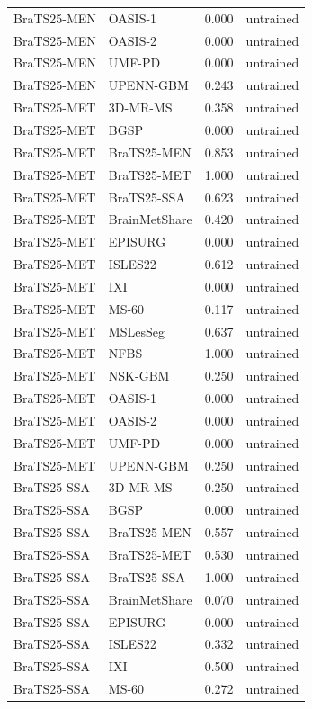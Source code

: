 \begin{tabular}{llrl}
BraTS25-MEN & OASIS-1 & 0.000 & untrained \\
BraTS25-MEN & OASIS-2 & 0.000 & untrained \\
BraTS25-MEN & UMF-PD & 0.000 & untrained \\
BraTS25-MEN & UPENN-GBM & 0.243 & untrained \\
BraTS25-MET & 3D-MR-MS & 0.358 & untrained \\
BraTS25-MET & BGSP & 0.000 & untrained \\
BraTS25-MET & BraTS25-MEN & 0.853 & untrained \\
BraTS25-MET & BraTS25-MET & 1.000 & untrained \\
BraTS25-MET & BraTS25-SSA & 0.623 & untrained \\
BraTS25-MET & BrainMetShare & 0.420 & untrained \\
BraTS25-MET & EPISURG & 0.000 & untrained \\
BraTS25-MET & ISLES22 & 0.612 & untrained \\
BraTS25-MET & IXI & 0.000 & untrained \\
BraTS25-MET & MS-60 & 0.117 & untrained \\
BraTS25-MET & MSLesSeg & 0.637 & untrained \\
BraTS25-MET & NFBS & 1.000 & untrained \\
BraTS25-MET & NSK-GBM & 0.250 & untrained \\
BraTS25-MET & OASIS-1 & 0.000 & untrained \\
BraTS25-MET & OASIS-2 & 0.000 & untrained \\
BraTS25-MET & UMF-PD & 0.000 & untrained \\
BraTS25-MET & UPENN-GBM & 0.250 & untrained \\
BraTS25-SSA & 3D-MR-MS & 0.250 & untrained \\
BraTS25-SSA & BGSP & 0.000 & untrained \\
BraTS25-SSA & BraTS25-MEN & 0.557 & untrained \\
BraTS25-SSA & BraTS25-MET & 0.530 & untrained \\
BraTS25-SSA & BraTS25-SSA & 1.000 & untrained \\
BraTS25-SSA & BrainMetShare & 0.070 & untrained \\
BraTS25-SSA & EPISURG & 0.000 & untrained \\
BraTS25-SSA & ISLES22 & 0.332 & untrained \\
BraTS25-SSA & IXI & 0.500 & untrained \\
BraTS25-SSA & MS-60 & 0.272 & untrained \\

\end{tabular}
